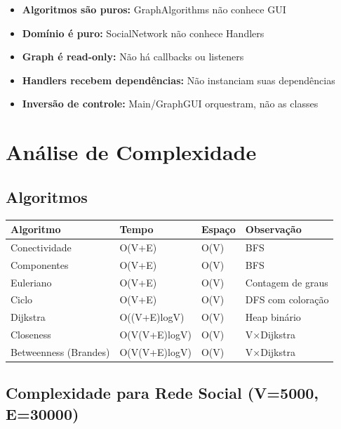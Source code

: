 \documentclass[12pt,a4paper]{article}
\begin{document}
\begin{itemize}
    \item \textbf{Algoritmos são puros:} GraphAlgorithms não conhece GUI
    \item \textbf{Domínio é puro:} SocialNetwork não conhece Handlers
    \item \textbf{Graph é read-only:} Não há callbacks ou listeners
    \item \textbf{Handlers recebem dependências:} Não instanciam suas dependências
    \item \textbf{Inversão de controle:} Main/GraphGUI orquestram, não as classes
\end{itemize}

\newpage

\section{Análise de Complexidade}

\subsection{Algoritmos}

\begin{table}[h]
\centering
\begin{tabular}{|l|l|l|l|}
\hline
\textbf{Algoritmo} & \textbf{Tempo} & \textbf{Espaço} & \textbf{Observação} \\
\hline
Conectividade & O(V+E) & O(V) & BFS \\
\hline
Componentes & O(V+E) & O(V) & BFS \\
\hline
Euleriano & O(V+E) & O(V) & Contagem de graus \\
\hline
Ciclo & O(V+E) & O(V) & DFS com coloração \\
\hline
Dijkstra & O((V+E)logV) & O(V) & Heap binário \\
\hline
Closeness & O(V(V+E)logV) & O(V) & V×Dijkstra \\
\hline
Betweenness (Brandes) & O(V(V+E)logV) & O(V) & V×Dijkstra \\
\hline
\end{tabular}
\end{table}

\subsection{Complexidade para Rede Social (V=5000, E=30000)}
\end{document}
